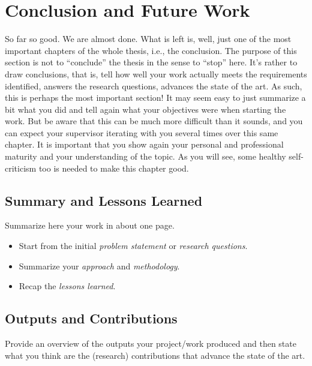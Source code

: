 \chapter{Conclusion and Future Work}
\label{capitolo8}
\thispagestyle{empty}


So far so good. We are almost done. What is left is, well, just one of the most important chapters of the whole thesis, i.e., the conclusion. The purpose of this section is not to ``conclude'' the thesis in the sense to ``stop'' here. It's rather to draw conclusions, that is, tell how well your work actually meets the requirements identified, answers the research questions, advances the state of the art. As such, this is perhaps the most important section! It may seem easy to just summarize a bit what you did and tell again what your objectives were when starting the work. But be aware that this can be much more difficult than it sounds, and you can expect your supervisor iterating with you several times over this same chapter. It is important that you show again your personal and professional maturity and your understanding of the topic. As you will see, some healthy self-criticism too is needed to make this chapter good.

\section{Summary and Lessons Learned}
Summarize here your work in about one page.

\begin{itemize}
\item[\Square] Start from the initial \emph{problem statement} or \emph{research questions}.
\item[\Square] Summarize your \emph{approach} and \emph{methodology}.
\item[\Square] Recap the \emph{lessons learned}.
\end{itemize}


\section{Outputs and Contributions}
Provide an overview of the outputs your project/work produced and then state what you think are the (research) contributions that advance the state of the art. 

